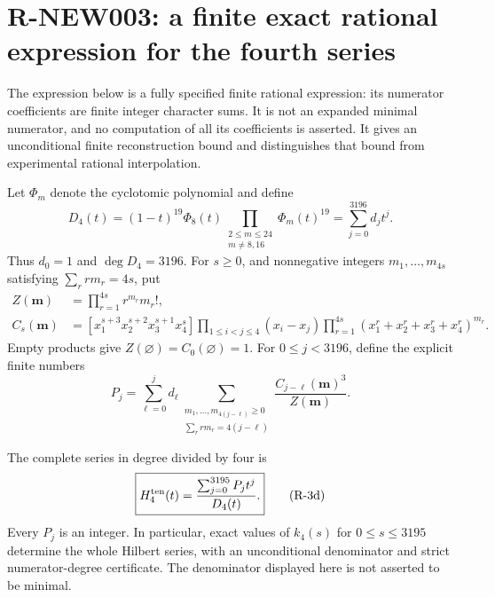\section{R-NEW003: a finite exact rational expression for the fourth series}
\label{sec:h4-finite-expression}

The expression below is a fully specified finite rational expression:
its numerator coefficients are finite integer character sums. It is not
an expanded minimal numerator, and no computation of all its coefficients
is asserted. It gives an unconditional finite reconstruction bound and
distinguishes that bound from experimental rational interpolation.

Let $\Phi_m$ denote the cyclotomic polynomial and define
\[
 D_4(t)=(1-t)^{19}\Phi_8(t)
       \prod_{\substack{2\le m\le24\\m\ne8,16}}\Phi_m(t)^{19}
       =\sum_{j=0}^{3196}d_jt^j.                    \tag{R-3a}
\]
Thus $d_0=1$ and $\deg D_4=3196$.
For $s\ge0$, and nonnegative integers $m_1,\ldots,m_{4s}$
satisfying $\sum_r rm_r=4s$, put
\[
\begin{split}
 Z(\mathbf m)&=\prod_{r=1}^{4s}r^{m_r}m_r!,\\
 C_s(\mathbf m)&=
 [x_1^{s+3}x_2^{s+2}x_3^{s+1}x_4^s]
 \prod_{1\le i<j\le4}(x_i-x_j)
 \prod_{r=1}^{4s}(x_1^r+x_2^r+x_3^r+x_4^r)^{m_r}.
\end{split}                                                   \tag{R-3b}
\]
Empty products give $Z(\varnothing)=C_0(\varnothing)=1$.
For $0\le j<3196$, define the explicit finite numbers
\[
 P_j=\sum_{\ell=0}^j d_\ell
       \sum_{\substack{m_1,\ldots,m_{4(j-\ell)}\ge0\\
                       \sum_r rm_r=4(j-\ell)}}
       \frac{C_{j-\ell}(\mathbf m)^3}{Z(\mathbf m)}.
                                                               \tag{R-3c}
\]

\begin{theorem}[R-NEW003]
The complete series in degree divided by four is
\[
 \boxed{\displaystyle H^{\rm ten}_4(t)
          =\frac{\sum_{j=0}^{3195}P_jt^j}{D_4(t)}.}             \tag{R-3d}
\]
Every $P_j$ is an integer. In particular, exact values of $k_4(s)$
for $0\le s\le3195$ determine the whole Hilbert series, with an
unconditional denominator and strict numerator-degree certificate.
The denominator displayed here is not asserted to be minimal.
\end{theorem}

